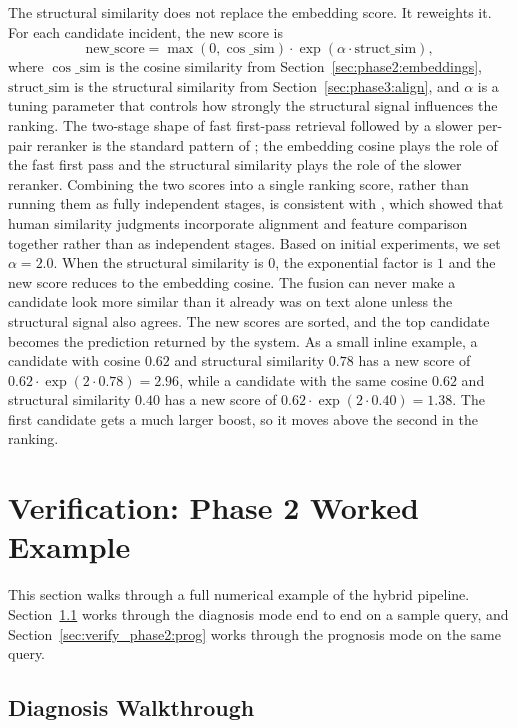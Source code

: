 \documentclass[11pt]{article}
\begin{document}
The structural similarity does not replace the embedding score. It reweights it. For each candidate incident, the new score is
\begin{equation}
\text{new\_score} = \max(0, \cos\_\text{sim}) \cdot \exp(\alpha \cdot \text{struct\_sim}),
\label{eq:fusion}
\end{equation}
where $\cos\_\text{sim}$ is the cosine similarity from Section~\ref{sec:phase2:embeddings}, $\text{struct\_sim}$ is the structural similarity from Section~\ref{sec:phase3:align}, and $\alpha$ is a tuning parameter that controls how strongly the structural signal influences the ranking. The two-stage shape of fast first-pass retrieval followed by a slower per-pair reranker is the standard pattern of \citet{NogueiraCho2019}; the embedding cosine plays the role of the fast first pass and the structural similarity plays the role of the slower reranker. Combining the two scores into a single ranking score, rather than running them as fully independent stages, is consistent with \citet{Goldstone1994}, which showed that human similarity judgments incorporate alignment and feature comparison together rather than as independent stages. Based on initial experiments, we set $\alpha = 2.0$. When the structural similarity is $0$, the exponential factor is $1$ and the new score reduces to the embedding cosine. The fusion can never make a candidate look more similar than it already was on text alone unless the structural signal also agrees. The new scores are sorted, and the top candidate becomes the prediction returned by the system. As a small inline example, a candidate with cosine $0.62$ and structural similarity $0.78$ has a new score of $0.62 \cdot \exp(2 \cdot 0.78) = 2.96$, while a candidate with the same cosine $0.62$ and structural similarity $0.40$ has a new score of $0.62 \cdot \exp(2 \cdot 0.40) = 1.38$. The first candidate gets a much larger boost, so it moves above the second in the ranking.

\section{Verification: Phase 2 Worked Example}
\label{sec:verify_phase2}

This section walks through a full numerical example of the hybrid pipeline. Section~\ref{sec:verify_phase2:diag} works through the diagnosis mode end to end on a sample query, and Section~\ref{sec:verify_phase2:prog} works through the prognosis mode on the same query.

\subsection{Diagnosis Walkthrough}
\label{sec:verify_phase2:diag}
\end{document}

